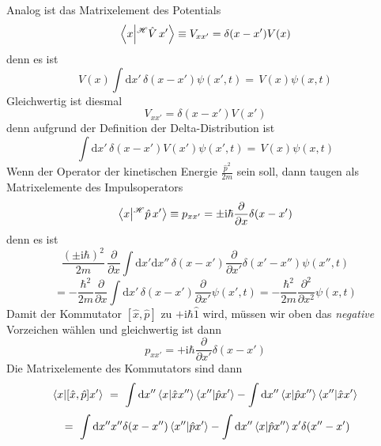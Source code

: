\documentclass[12pt]{article}
\begin{document}
Analog ist das Matrixelement des Potentials
\begin{equation*}
\bra{x}\ket{^\mathscr{H}\hat{V}\,x'}\equiv V_{xx'} = 
\delta(x-x') V(x)
\end{equation*}
denn es ist
\begin{equation*}
V(x) \int \mathrm{d}x'\,\delta(x-x') \psi (x',t)
=\, V(x) \psi (x,t)
\end{equation*}
Gleichwertig ist diesmal 
\begin{equation*}
V_{xx'} = \delta(x-x') V(x')
\end{equation*}
denn aufgrund der Definition der Delta-Distribution ist
\begin{equation*}
\int \mathrm{d}x'\,\delta(x-x') V(x') \psi (x',t)
=\, V(x) \psi (x,t)
\end{equation*}
Wenn der Operator der kinetischen Energie $\frac{\hat{p}^2}{2m}$ sein soll, dann taugen als Matrixelemente des Impulsoperators
\begin{equation*}
\bra{x}\ket{^\mathscr{H}\hat{p}\,x'}\equiv p_{xx'} = 
\pm \mathrm {i} \hbar \frac{\partial }{\partial x}\delta(x-x')
\end{equation*} 
denn es ist
\begin{equation*}
\frac{(\pm\mathrm{i}\hbar)^2}{2m}\,\frac{\partial }{\partial x} 
\int \mathrm{d}x'\mathrm{d}x''\,\delta(x-x') \frac{\partial }{\partial x'} \delta(x'-x'')\psi(x'',t)
\end{equation*}
\begin{equation*}
=-\frac{\hbar^2}{2m} \frac{\partial }{\partial x}\int \mathrm{d}x'\,\delta(x-x')\frac{\partial }{\partial x'} \psi(x',t)
=-\frac{\hbar^2}{2m} \frac {\partial^2}{\partial x^2}\psi (x,t)
\end{equation*}
Damit der Kommutator $[\hat{x},\hat{p}]$ zu $+\mathrm{i}\hbar\hat{1}$ wird, müssen wir oben das \emph{negative} Vorzeichen wählen und gleichwertig ist dann
\begin{equation*}
p_{xx'} = + \mathrm {i} \hbar \frac{\partial }{\partial x'}\delta(x-x')
\end{equation*} 
Die Matrixelemente des Kommutators sind dann
\begin{equation*}
\bra{x}\ket{[\hat{x},\hat{p}]x'}\ =\ 
\int \mathrm{d}x'' \bra{x}\ket{\hat{x}x''} \bra{x''}\ket{\hat{p}x'} 
- \int \mathrm{d}x'' \bra{x}\ket{\hat{p}x''} \bra{x''}\ket{\hat{x}x'} 
\end{equation*}
\begin{equation*}
\ =\ \int \mathrm{d}x'' x''\delta(x-x'') \bra{x''}\ket{\hat{p}x'} 
- \int \mathrm{d}x'' \bra{x}\ket{\hat{p}x''} x'\delta(x''-x')
\end{equation*}
\end{document}
